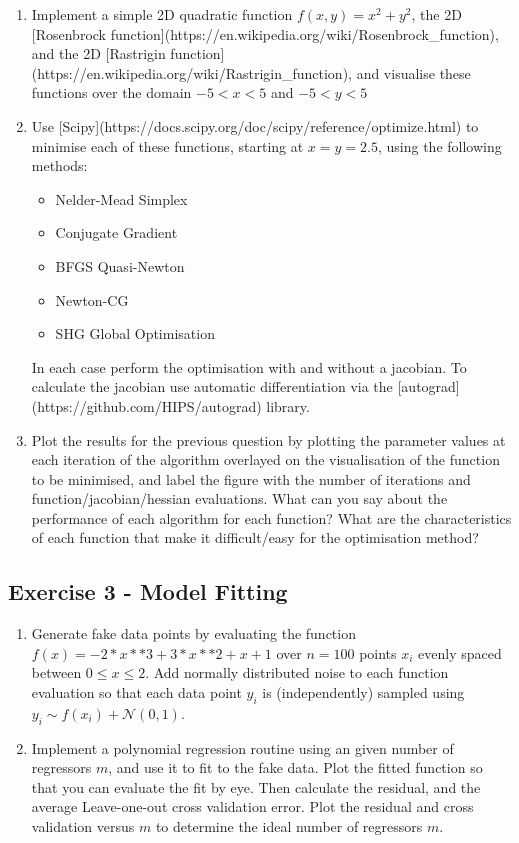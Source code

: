 \documentclass[a4paper]{article}
\begin{document}
\begin{enumerate}[label=\Alph*]
  \item Implement a simple 2D quadratic function $f(x, y) = x^2 + y^2$, the 2D [Rosenbrock
    function](https://en.wikipedia.org/wiki/Rosenbrock_function), and the 2D [Rastrigin
    function](https://en.wikipedia.org/wiki/Rastrigin_function), and visualise these
    functions over the domain $-5 < x < 5$ and $-5 < y < 5$
  \item Use [Scipy](https://docs.scipy.org/doc/scipy/reference/optimize.html) to
    minimise each of these functions, starting at $x = y = 2.5$, using the following methods:
        \begin{itemize}
        \item Nelder-Mead Simplex
        \item Conjugate Gradient
        \item BFGS Quasi-Newton
        \item Newton-CG
        \item SHG Global Optimisation
        \end{itemize}
        In each case perform the optimisation with and without a jacobian. To calculate
        the jacobian use automatic differentiation via the [autograd](https://github.com/HIPS/autograd) library.
        
    \item Plot the results for the previous question by plotting the parameter values at
      each iteration of the algorithm overlayed on the visualisation of the function to
      be minimised, and label the figure with the number of iterations and function/jacobian/hessian
      evaluations. What can you say about the performance of each algorithm for each
      function? What are the characteristics of each function that make it
      difficult/easy for the optimisation method?
\end{enumerate}
      

\subsection*{Exercise 3 - Model Fitting}

\begin{enumerate}[label=\Alph*]
  \item Generate fake data points by evaluating the function $f(x) = -2*x**3 +
    3*x**2 + x + 1$ over $n=100$ points $x_i$ evenly spaced between $0 \le x \le 2$. Add
    normally distributed noise to each function evaluation so that each data point $y_i$
    is (independently) sampled using $y_i \sim f(x_i) + \mathcal{N}(0, 1)$.

  \item Implement a polynomial regression routine using an given number of regressors
    $m$, and use it to fit to the fake data. Plot the fitted function so that you can
    evaluate the fit by eye. Then calculate the residual, and the average
    Leave-one-out cross validation error. Plot the residual and cross validation versus
    $m$ to determine the ideal number of regressors $m$.

\end{enumerate}
    
\end{document}
